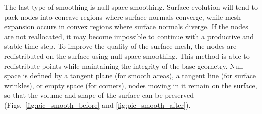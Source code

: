 \documentclass[
11pt,%
tightenlines,%
twoside,%
onecolumn,%
nofloats,%
nobibnotes,%
nofootinbib,%
superscriptaddress,%
noshowpacs,%
centertags]%
{revtex4-2}
\begin{document}
The last type of smoothing is null-space smoothing.
Surface evolution will tend to pack nodes into concave regions where surface normals converge, while mesh expansion occurs in convex regions where surface normals diverge.
If the nodes are not reallocated, it may become impossible to continue with a productive and stable time step.
To improve the quality of the surface mesh, the nodes are redistributed on the surface using null-space smoothing.
This method is able to redistribute points while maintaining the integrity of the base geometry.
Null-space is defined by a tangent plane (for smooth areas),  a
tangent line (for surface wrinkles), or empty space (for corners),
nodes moving in it remain on the surface, so that the volume and
shape of the surface can be preserved
(Figs.~\ref{fig:pic_smooth_before} and \ref{fig:pic_smooth_after}).
\end{document}
